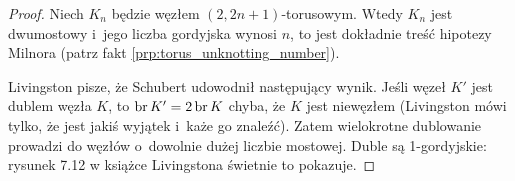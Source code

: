 \begin{proof}
    Niech $K_n$ będzie węzłem $(2, 2n+1)$-torusowym.
    Wtedy $K_n$ jest dwumostowy i~jego liczba gordyjska wynosi $n$, to jest dokładnie treść hipotezy Milnora (patrz fakt \ref{prp:torus_unknotting_number}).

    Livingston pisze, że Schubert \cite[s. 281]{schubert1954} udowodnił następujący wynik.
    Jeśli węzeł $K'$ jest dublem węzła $K$, to $\operatorname{br} K' = 2 \operatorname{br} K$ chyba, że $K$ jest niewęzłem (Livingston mówi tylko, że jest jakiś wyjątek i~każe go znaleźć).
    Zatem wielokrotne dublowanie prowadzi do węzłów o~dowolnie dużej liczbie mostowej.
    Duble są 1-gordyjskie: rysunek 7.12 w książce Livingstona \cite[s. 146]{livingston1993} świetnie to pokazuje.
\end{proof}


%



